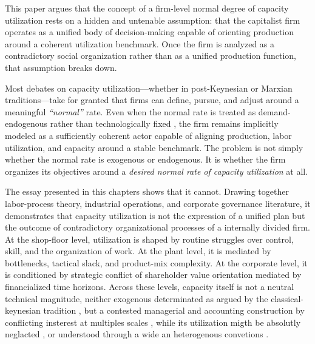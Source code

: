 This paper argues that the concept of a firm-level normal degree of capacity utilization rests on a hidden and untenable assumption: that the capitalist firm operates as a unified body of decision-making capable of orienting production around a coherent utilization benchmark. Once the firm is analyzed as a contradictory social organization rather than as a unified production function, that assumption breaks down.

Most debates on capacity utilization—whether in post-Keynesian or Marxian traditions—take for granted that firms can define, pursue, and adjust around a meaningful \emph{“normal”} rate. Even when the normal rate is treated as demand-endogenous rather than technologically fixed \citep{Nikiforos2013}, the firm remains implicitly modeled as a sufficiently coherent actor capable of aligning production, labor utilization, and capacity around a stable benchmark. The problem is not simply whether the normal rate is exogenous or endogenous. It is whether the firm organizes its objectives around a \emph{desired normal rate of capacity utilization} at all.

The essay presented in this chapters shows that it cannot. Drawing together labor-process theory, industrial operations, and corporate governance literature, it demonstrates that capacity utilization is not the expression of a unified plan but the outcome of contradictory organizational processes of a internally divided firm. At the shop-floor level, utilization is shaped by routine struggles over control, skill, and the organization of work. At the plant level, it is mediated by bottlenecks, tactical slack, and product-mix complexity. At the corporate level, it is conditioned by strategic conflict of shareholder value orientation mediated by financialized time horizons. Across these levels, capacity itself is not a neutral technical magnitude, neither exogenous determinated as argued by the classical-keynesian tradition \citep{Kurz1986}, but a contested managerial and accounting construction by conflicting insterest at multiples scales \citep{Vidal2022}, while its utilization migth be absolutly neglacted \citep{Singh2022}, or understood through a wide an heterogenous convetions \citep{USGAO1978,LavoieRodriguezSeccareccia2004} .

